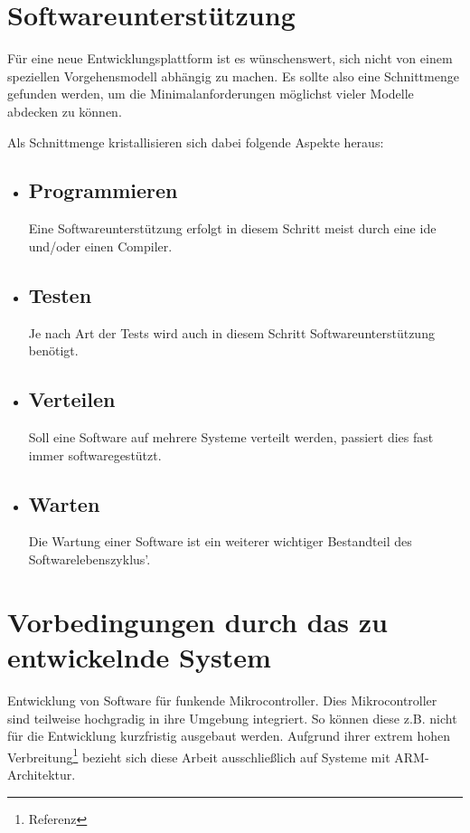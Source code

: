 \iffalse
\section{Softwareunterstützung}
Für eine neue Entwicklungsplattform ist es wünschenswert, sich nicht von einem
speziellen Vorgehensmodell abhängig zu machen. Es sollte also eine Schnittmenge
gefunden werden, um die Minimalanforderungen möglichst vieler Modelle abdecken
zu können.

Als Schnittmenge kristallisieren sich dabei folgende Aspekte heraus:
\begin{itemize}
  \item \subsection*{Programmieren} Eine Softwareunterstützung erfolgt in diesem
  Schritt meist durch eine \gls{ide} und/oder einen Compiler.
  \item \subsection*{Testen} Je nach Art der Tests wird auch in diesem Schritt
  Softwareunterstützung benötigt. 
  \item \subsection*{Verteilen} Soll eine Software auf mehrere
  Systeme verteilt werden, passiert dies fast immer softwaregestützt.
  \item \subsection*{Warten} Die Wartung einer Software ist ein weiterer
  wichtiger Bestandteil des Softwarelebenszyklus'.
\end{itemize}
\section{Vorbedingungen durch das zu entwickelnde System}\label{sec:vorb}
Entwicklung von Software für funkende Mikrocontroller. Dies Mikrocontroller sind
teilweise hochgradig in ihre Umgebung integriert. So können diese z.B.
nicht für die Entwicklung kurzfristig ausgebaut werden. Aufgrund ihrer extrem
hohen Verbreitung\footnote{Referenz} bezieht sich diese Arbeit ausschließlich
auf Systeme mit ARM-Architektur.

